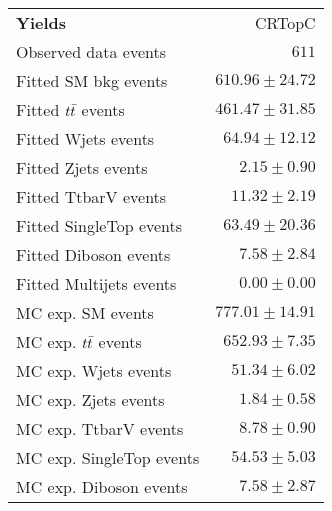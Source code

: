 

\begin{table}[h!]
\begin{center}
\setlength{\tabcolsep}{0.0pc}
{\small
\begin{tabular*}{\textwidth}{@{\extracolsep{\fill}}lr}
\noalign{\smallskip}\hline\noalign{\smallskip}
{\bf Yields}           & CRTopC                  \\[-0.05cm]
\noalign{\smallskip}\hline\noalign{\smallskip}
Observed data events          & $611$                       \\
\noalign{\smallskip}\hline\noalign{\smallskip}
Fitted SM bkg events         & $610.96 \pm 24.72$                     \\
\noalign{\smallskip}\hline\noalign{\smallskip}
        Fitted $t\bar{t}$ events         & $461.47 \pm 31.85$                 \\
        Fitted Wjets events         & $64.94 \pm 12.12$                    \\
        Fitted Zjets events         & $2.15 \pm 0.90$                \\
        Fitted TtbarV events         & $11.32 \pm 2.19$                    \\
        Fitted SingleTop events         & $63.49 \pm 20.36$                   \\
        Fitted Diboson events         & $7.58 \pm 2.84$                       \\
        Fitted Multijets events         & $0.00 \pm 0.00$                    \\
 \noalign{\smallskip}\hline\noalign{\smallskip}
MC exp. SM events              & $777.01 \pm 14.91$                   \\
\noalign{\smallskip}\hline\noalign{\smallskip}
        MC exp. $t\bar{t}$ events         & $652.93 \pm 7.35$                     \\
        MC exp. Wjets events         & $51.34 \pm 6.02$                 \\
        MC exp. Zjets events         & $1.84 \pm 0.58$                 \\
        MC exp. TtbarV events         & $8.78 \pm 0.90$                      \\
        MC exp. SingleTop events         & $54.53 \pm 5.03$                  \\
        MC exp. Diboson events         & $7.58 \pm 2.87$                     \\

\end{tabular*}}
\end{center}
\end{table}
